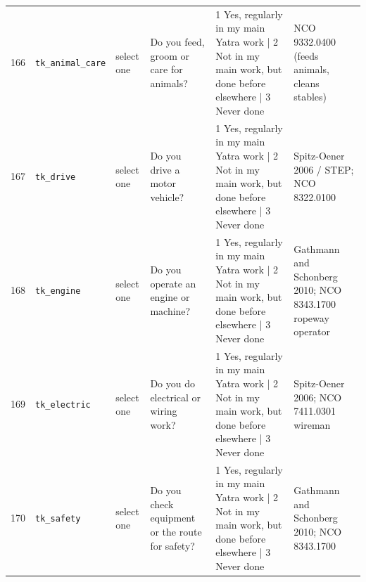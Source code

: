 \documentclass[9pt,a4paper,landscape]{article}
\begin{document}
\begin{longtable}{@{}p{0.5cm}p{3.3cm}p{1.7cm}p{7.3cm}p{5.6cm}p{5.4cm}@{}}
\footnotesize 166 & \footnotesize\texttt{tk\_animal\_care} & \scriptsize select one & \footnotesize Do you feed, groom or care for animals? \par\vspace{1pt}{\footnotesize\color{hdr}{\hifont क्या आप जानवरों को खिलाना, सँवारना या उनकी देखभाल करना का काम करते हैं? (1 अपने मुख्य यात्रा-काम में नियमित; 2 मुख्य काम में नहीं, पर पहले कहीं और किया है; 3 कभी नहीं)}} & \scriptsize 1 Yes, regularly in my main Yatra work | 2 Not in my main work, but done before elsewhere | 3 Never done & \scriptsize NCO 9332.0400 (feeds animals, cleans stables)\\
\footnotesize 167 & \footnotesize\texttt{tk\_drive} & \scriptsize select one & \footnotesize Do you drive a motor vehicle? \par\vspace{1pt}{\footnotesize\color{hdr}{\hifont क्या आप गाड़ी चलाना का काम करते हैं? (1 अपने मुख्य यात्रा-काम में नियमित; 2 मुख्य काम में नहीं, पर पहले कहीं और किया है; 3 कभी नहीं)}} & \scriptsize 1 Yes, regularly in my main Yatra work | 2 Not in my main work, but done before elsewhere | 3 Never done & \scriptsize Spitz-Oener 2006 / STEP; NCO 8322.0100\\
\footnotesize 168 & \footnotesize\texttt{tk\_engine} & \scriptsize select one & \footnotesize Do you operate an engine or machine? \par\vspace{1pt}{\footnotesize\color{hdr}{\hifont क्या आप इंजन या मशीन चलाना का काम करते हैं? (1 अपने मुख्य यात्रा-काम में नियमित; 2 मुख्य काम में नहीं, पर पहले कहीं और किया है; 3 कभी नहीं)}} & \scriptsize 1 Yes, regularly in my main Yatra work | 2 Not in my main work, but done before elsewhere | 3 Never done & \scriptsize Gathmann and Schonberg 2010; NCO 8343.1700 ropeway operator\\
\footnotesize 169 & \footnotesize\texttt{tk\_electric} & \scriptsize select one & \footnotesize Do you do electrical or wiring work? \par\vspace{1pt}{\footnotesize\color{hdr}{\hifont क्या आप बिजली या तार का काम करना का काम करते हैं? (1 अपने मुख्य यात्रा-काम में नियमित; 2 मुख्य काम में नहीं, पर पहले कहीं और किया है; 3 कभी नहीं)}} & \scriptsize 1 Yes, regularly in my main Yatra work | 2 Not in my main work, but done before elsewhere | 3 Never done & \scriptsize Spitz-Oener 2006; NCO 7411.0301 wireman\\
\footnotesize 170 & \footnotesize\texttt{tk\_safety} & \scriptsize select one & \footnotesize Do you check equipment or the route for safety? \par\vspace{1pt}{\footnotesize\color{hdr}{\hifont क्या आप सामान या रास्ते की सुरक्षा जाँचना का काम करते हैं? (1 अपने मुख्य यात्रा-काम में नियमित; 2 मुख्य काम में नहीं, पर पहले कहीं और किया है; 3 कभी नहीं)}} & \scriptsize 1 Yes, regularly in my main Yatra work | 2 Not in my main work, but done before elsewhere | 3 Never done & \scriptsize Gathmann and Schonberg 2010; NCO 8343.1700\\

\end{longtable}
\end{document}
